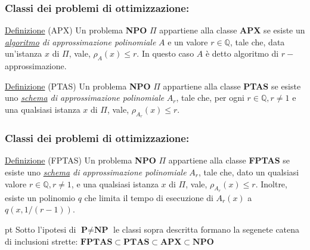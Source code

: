 \documentclass{beamer}
\begin{document}
\begin{frame}
    \frametitle{Classi dei problemi di ottimizzazione:}
    \begin{block}{\underline{Definizione} (APX)}
        Un problema \textbf{NPO} $\Pi$ appartiene alla classe \textbf{APX} se esiste un \textit{\underline{algoritmo} di approssimazione polinomiale} $A$ e un valore $r \in \mathbb{Q}$, tale che, data un'istanza $x$ di $\Pi$, vale, $\rho_A(x) \le r$. In questo caso $A$ è detto algoritmo di $r-$approssimazione.
    \end{block}
    \vskip 20pt
    \begin{block}{\underline{Definizione} (PTAS)}
        Un problema \textbf{NPO} $\Pi$ appartiene alla classe \textbf{PTAS} se esiste uno \textit{\underline{schema} di approssimazione polinomiale} $A_r$, tale che, per ogni $r \in \mathbb{Q}, r \neq 1$ e una qualsiasi istanza $x$ di $\Pi$, vale,  $\rho_{A_r}(x) \leq r$.
 
    \end{block}
\end{frame}

\begin{frame}
    \frametitle{Classi dei problemi di ottimizzazione:}
    \begin{block}{\underline{Definizione} (FPTAS)}
        Un problema \textbf{NPO} $\Pi$ appartiene alla classe \textbf{FPTAS} se esiste uno \textit{\underline{schema} di approssimazione polinomiale} $A_r$, tale che, dato un qualsiasi valore $r \in \mathbb{Q}, r \neq 1$, e una qualsiasi istanza $x$ di $\Pi$, vale, $ \rho_{A_r}(x) \leq r$. Inoltre, esiste un polinomio $q$ che limita il tempo di esecuzione di $A_r(x)$ a $q(x,1/(r-1))$.
    \end{block}
     pt
    Sotto l'ipotesi di $\textbf{P} \neq \textbf{NP}$ le classi sopra descritta formano la segenete catena di inclusioni strette: $\textbf{FPTAS} \subset \textbf{PTAS} \subset \textbf{APX} \subset \textbf{NPO}$
\end{frame}
\end{document}
